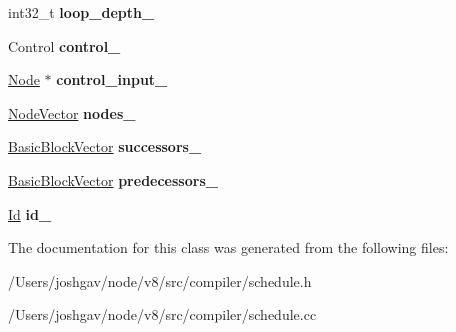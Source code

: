 \begin{DoxyCompactItemize}
\item 
int32\+\_\+t {\bfseries loop\+\_\+depth\+\_\+}\hypertarget{classv8_1_1internal_1_1compiler_1_1_basic_block_a5a934a1666a2b973322f498ba01ebf6d}{}\label{classv8_1_1internal_1_1compiler_1_1_basic_block_a5a934a1666a2b973322f498ba01ebf6d}

\item 
Control {\bfseries control\+\_\+}\hypertarget{classv8_1_1internal_1_1compiler_1_1_basic_block_a2974f1c0065ee8456a1254340e82cf32}{}\label{classv8_1_1internal_1_1compiler_1_1_basic_block_a2974f1c0065ee8456a1254340e82cf32}

\item 
\hyperlink{classv8_1_1internal_1_1compiler_1_1_node}{Node} $\ast$ {\bfseries control\+\_\+input\+\_\+}\hypertarget{classv8_1_1internal_1_1compiler_1_1_basic_block_aad0c621c6593ae5ed3526459ba19bcdc}{}\label{classv8_1_1internal_1_1compiler_1_1_basic_block_aad0c621c6593ae5ed3526459ba19bcdc}

\item 
\hyperlink{classv8_1_1internal_1_1_zone_vector}{Node\+Vector} {\bfseries nodes\+\_\+}\hypertarget{classv8_1_1internal_1_1compiler_1_1_basic_block_a67709542a279bc0e37eb0357be13ccf1}{}\label{classv8_1_1internal_1_1compiler_1_1_basic_block_a67709542a279bc0e37eb0357be13ccf1}

\item 
\hyperlink{classv8_1_1internal_1_1_zone_vector}{Basic\+Block\+Vector} {\bfseries successors\+\_\+}\hypertarget{classv8_1_1internal_1_1compiler_1_1_basic_block_aaf45991f1aad3088c0060201424f5391}{}\label{classv8_1_1internal_1_1compiler_1_1_basic_block_aaf45991f1aad3088c0060201424f5391}

\item 
\hyperlink{classv8_1_1internal_1_1_zone_vector}{Basic\+Block\+Vector} {\bfseries predecessors\+\_\+}\hypertarget{classv8_1_1internal_1_1compiler_1_1_basic_block_aeabcdd021b1a74451a624d80dc028f35}{}\label{classv8_1_1internal_1_1compiler_1_1_basic_block_aeabcdd021b1a74451a624d80dc028f35}

\item 
\hyperlink{classv8_1_1internal_1_1compiler_1_1_basic_block_1_1_id}{Id} {\bfseries id\+\_\+}\hypertarget{classv8_1_1internal_1_1compiler_1_1_basic_block_a447f1657d3fa865df0d3bd56df6a6ac1}{}\label{classv8_1_1internal_1_1compiler_1_1_basic_block_a447f1657d3fa865df0d3bd56df6a6ac1}

\end{DoxyCompactItemize}


The documentation for this class was generated from the following files\+:\begin{DoxyCompactItemize}
\item 
/\+Users/joshgav/node/v8/src/compiler/schedule.\+h\item 
/\+Users/joshgav/node/v8/src/compiler/schedule.\+cc\end{DoxyCompactItemize}
